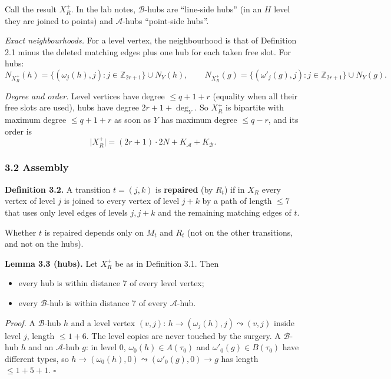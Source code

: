 \documentclass[
  11pt,
]{article}
\providecommand{\tightlist}{%
  \setlength{\itemsep}{0pt}\setlength{\parskip}{0pt}}
\begin{document}
Call the result \(X_R^+\). In the lab notes, \(\mathcal B\)-hubs are ``line-side hubs'' (in an \(H\) level they are
joined to points) and \(\mathcal A\)-hubs ``point-side hubs''.

\emph{Exact neighbourhoods.} For a level vertex, the neighbourhood is that of Definition 2.1 minus the deleted matching
edges plus one hub for each taken free slot. For hubs:
\[N_{X_R^+}(h) = \{(\omega_j(h), j) : j\in\mathbb Z_{2r+1}\}\cup N_Y(h),\qquad N_{X_R^+}(g) = \{(\omega'_j(g), j): j\in\mathbb Z_{2r+1}\}\cup N_Y(g).\]

\emph{Degree and order.} Level vertices have degree \(\le q+1+r\) (equality when all their free slots are used), hubs
have degree \(2r+1+\deg_Y\). So \(X_R^+\) is bipartite with maximum degree \(\le q+1+r\) as soon as \(Y\) has maximum
degree \(\le q-r\), and its order is \[\lvert X_R^+\rvert = (2r+1)\cdot 2N + K_{\mathcal A} + K_{\mathcal B}.\]

\hypertarget{assembly}{%
\subsubsection{3.2 Assembly}\label{assembly}}

\textbf{Definition 3.2.} A transition \(t=(j,k)\) is \textbf{repaired} (by \(R_t\)) if in \(X_R\) every vertex of level
\(j\) is joined to every vertex of level \(j+k\) by a path of length \(\le 7\) that uses only level edges of levels
\(j, j+k\) and the remaining matching edges of \(t\).

Whether \(t\) is repaired depends only on \(M_t\) and \(R_t\) (not on the other transitions, and not on the hubs).

\textbf{Lemma 3.3 (hubs).} Let \(X_R^+\) be as in Definition 3.1. Then

\begin{itemize}
\tightlist
\item
  every hub is within distance 7 of every level vertex;
\item
  every \(\mathcal B\)-hub is within distance 7 of every \(\mathcal A\)-hub.
\end{itemize}

\emph{Proof.} A \(\mathcal B\)-hub \(h\) and a level vertex \((v,j)\): \(h\to(\omega_j(h),j)\leadsto(v,j)\) inside level
\(j\), length \(\le 1+6\). The level copies are never touched by the surgery. A \(\mathcal B\)-hub \(h\) and an
\(\mathcal A\)-hub \(g\): in level \(0\), \(\omega_0(h)\in A(\tau_0)\) and \(\omega'_0(g)\in B(\tau_0)\) have different
types, so \(h\to(\omega_0(h),0)\leadsto(\omega'_0(g),0)\to g\) has length \(\le 1+5+1\). \(\square\)
\end{document}
